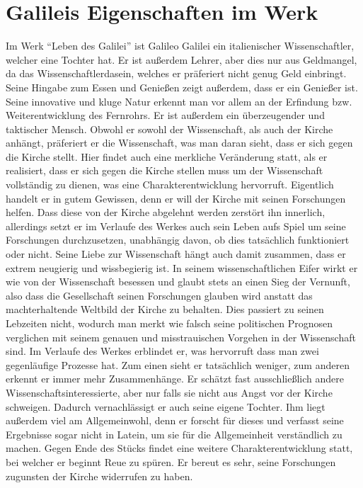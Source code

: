\documentclass[12pt]{scrreprt}
\begin{document}
\section{Galileis Eigenschaften im Werk}
	\label{sec:galileis eigenschaften im werk}
Im Werk \enquote{Leben des Galilei} ist Galileo Galilei ein italienischer Wissenschaftler, welcher eine Tochter hat.
Er ist außerdem Lehrer, aber dies nur aus Geldmangel, da das Wissenschaftlerdasein, welches er präferiert nicht genug Geld einbringt.
Seine Hingabe zum Essen und Genießen zeigt außerdem, dass er ein Genießer ist.
Seine innovative und kluge Natur erkennt man vor allem an der Erfindung bzw. Weiterentwicklung des Fernrohrs.
Er ist außerdem ein überzeugender und taktischer Mensch.
Obwohl er sowohl der Wissenschaft, als auch der Kirche anhängt, präferiert er die Wissenschaft, was man daran sieht, dass er sich gegen die Kirche stellt. 
Hier findet auch eine merkliche Veränderung statt, als er realisiert, dass er sich gegen die Kirche stellen muss um der Wissenschaft vollständig zu dienen, was eine Charakterentwicklung hervorruft.
Eigentlich handelt er in gutem Gewissen, denn er will der Kirche mit seinen Forschungen helfen.
Dass diese von der Kirche abgelehnt werden zerstört ihn innerlich, allerdings setzt er im Verlaufe des Werkes auch sein Leben aufs Spiel um seine Forschungen durchzusetzen, unabhängig davon, ob dies tatsächlich funktioniert oder nicht.
Seine Liebe zur Wissenschaft hängt auch damit zusammen, dass er extrem neugierig und wissbegierig ist.
In seinem wissenschaftlichen Eifer wirkt er wie von der Wissenschaft besessen und glaubt stets an einen Sieg der Vernunft, also dass die Gesellschaft seinen Forschungen glauben wird anstatt das machterhaltende Weltbild der Kirche zu behalten.
Dies passiert zu seinen Lebzeiten nicht, wodurch man merkt wie falsch seine politischen Prognosen verglichen mit seinem genauen und misstrauischen Vorgehen in der Wissenschaft sind.
Im Verlaufe des Werkes erblindet er, was hervorruft dass man zwei gegenläufige Prozesse hat. 
Zum einen sieht er tatsächlich weniger, zum anderen erkennt er immer mehr Zusammenhänge.
Er schätzt fast ausschließlich andere Wissenschaftsinteressierte, aber nur falls sie nicht aus Angst vor der Kirche schweigen.
Dadurch vernachlässigt er auch seine eigene Tochter.
Ihm liegt außerdem viel am Allgemeinwohl, denn er forscht für dieses und verfasst seine Ergebnisse sogar nicht in Latein, um sie für die Allgemeinheit verständlich zu machen.
Gegen Ende des Stücks findet eine weitere Charakterentwicklung statt, bei welcher er beginnt Reue zu spüren.
Er bereut es sehr, seine Forschungen zugunsten der Kirche widerrufen zu haben.
\autocite{wiki:Leben_des_Galilei}
\autocite{wiki:Leben_des_Galilei_Charakterisierungen}
\autocite{wiki:Leben_des_Galilei_Studysmarter}
\autocite{wiki:Leben_des_Galilei_Personen}
\end{document}
